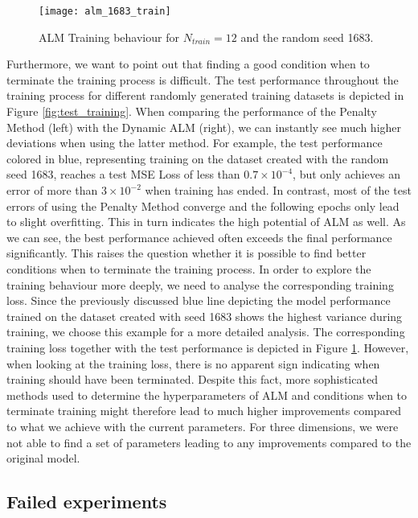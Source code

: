 \begin{figure}
	\centering
	\texttt{[image: alm\_1683\_train]}
	\caption{ALM Training behaviour for $N_{train} = 12$ and the random seed 1683.}
	\label{fig:alm_1683_train}
\end{figure}
\indent Furthermore, we want to point out that finding a good condition when to terminate the training process is difficult. The test performance throughout the training process for different randomly generated training datasets is depicted in Figure \ref{fig:test_training}. When comparing the performance of the Penalty Method (left) with the Dynamic ALM (right), we can instantly see much higher deviations when using the latter method. For example, the test performance colored in blue, representing training on the dataset created with the random seed 1683, reaches a test MSE Loss of less than $0.7\times 10^{-4}$, but only achieves an error of more than $3\times 10^{-2}$ when training has ended. In contrast, most of the test errors of using the Penalty Method converge and the following epochs only lead to slight overfitting. This in turn indicates the high potential of ALM as well. As we can see, the best performance achieved often exceeds the final performance significantly. This raises the question whether it is possible to find better conditions when to terminate the training process. In order to explore the training behaviour more deeply, we need to analyse the corresponding training loss. Since the previously discussed blue line depicting the model performance trained on the dataset created with seed 1683 shows the highest variance during training, we choose this example for a more detailed analysis. The corresponding training loss together with the test performance is depicted in Figure \ref{fig:alm_1683_train}. However, when looking at the training loss, there is no apparent sign indicating when training should have been terminated. Despite this fact, more sophisticated methods used to determine the hyperparameters of ALM and conditions when to terminate training might therefore lead to much higher improvements compared to what we achieve with the current parameters. For three dimensions, we were not able to find a set of parameters leading to any improvements compared to the original model.

\subsection{Failed experiments}

